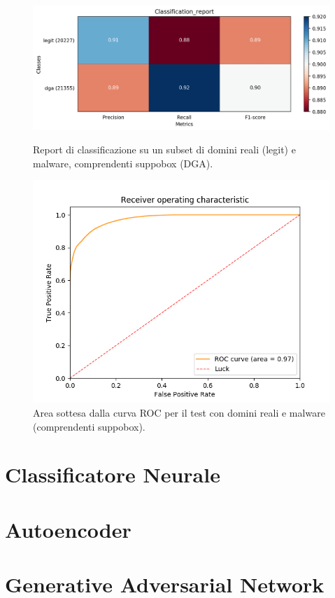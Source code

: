 \begin{figure}[!htbp]
    \centering
    \includegraphics[width=\columnwidth]{figures/rndf_tra_sup_sup/class_rep.png}
    \caption{Report di classificazione su un subset di domini reali (legit) e malware, comprendenti suppobox (DGA).\label{fig:repall}}

    \centering
    \includegraphics[width=\columnwidth]{figures/rndf_tra_sup_sup/roc_plot.png}
    \caption{Area sottesa dalla curva ROC per il test con domini reali e malware (comprendenti suppobox).\label{fig:rocall}}
\end{figure}

\section{Classificatore Neurale}

\section{Autoencoder}

\section{Generative Adversarial Network}
